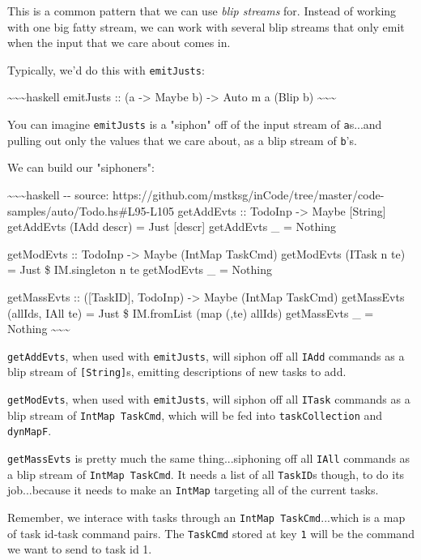 \documentclass[]{article}
\begin{document}
This is a common pattern that we can use \emph{blip streams} for. Instead of
working with one big fatty stream, we can work with several blip streams that
only emit when the input that we care about comes in.

Typically, we'd do this with \texttt{emitJusts}:

\textasciitilde{}\textasciitilde{}\textasciitilde{}haskell emitJusts :: (a
-\textgreater{} Maybe b) -\textgreater{} Auto m a (Blip b)
\textasciitilde{}\textasciitilde{}\textasciitilde{}

You can imagine \texttt{emitJusts} is a "siphon" off of the input stream of
\texttt{a}s...and pulling out only the values that we care about, as a blip
stream of \texttt{b}'s.

We can build our "siphoners":

\textasciitilde{}\textasciitilde{}\textasciitilde{}haskell -\/- source:
https://github.com/mstksg/inCode/tree/master/code-samples/auto/Todo.hs\#L95-L105
getAddEvts :: TodoInp -\textgreater{} Maybe {[}String{]} getAddEvts (IAdd descr)
= Just {[}descr{]} getAddEvts \_ = Nothing

getModEvts :: TodoInp -\textgreater{} Maybe (IntMap TaskCmd) getModEvts (ITask n
te) = Just \$ IM.singleton n te getModEvts \_ = Nothing

getMassEvts :: ({[}TaskID{]}, TodoInp) -\textgreater{} Maybe (IntMap TaskCmd)
getMassEvts (allIds, IAll te) = Just \$ IM.fromList (map (,te) allIds)
getMassEvts \_ = Nothing \textasciitilde{}\textasciitilde{}\textasciitilde{}

\texttt{getAddEvts}, when used with \texttt{emitJusts}, will siphon off all
\texttt{IAdd} commands as a blip stream of \texttt{{[}String{]}}s, emitting
descriptions of new tasks to add.

\texttt{getModEvts}, when used with \texttt{emitJusts}, will siphon off all
\texttt{ITask} commands as a blip stream of \texttt{IntMap\ TaskCmd}, which will
be fed into \texttt{taskCollection} and \texttt{dynMapF}.

\texttt{getMassEvts} is pretty much the same thing...siphoning off all
\texttt{IAll} commands as a blip stream of \texttt{IntMap\ TaskCmd}. It needs a
list of all \texttt{TaskID}s though, to do its job...because it needs to make an
\texttt{IntMap} targeting all of the current tasks.

Remember, we interace with tasks through an \texttt{IntMap\ TaskCmd}...which is
a map of task id-task command pairs. The \texttt{TaskCmd} stored at key
\texttt{1} will be the command we want to send to task id 1.
\end{document}
